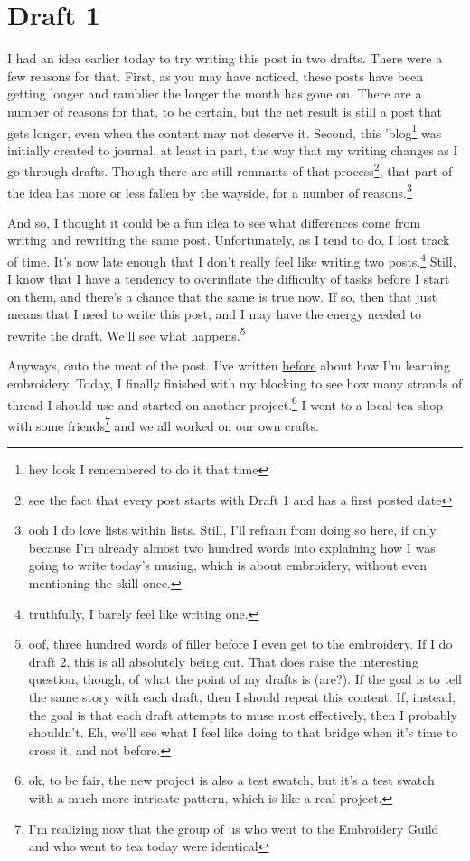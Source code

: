 \documentclass[12pt]{article}[titlepage]
\newcommand{\1}{\={a}}
\newcommand{\2}{\={e}}
\newcommand{\3}{\={\i}}
\newcommand{\4}{\=o}
\newcommand{\5}{\=u}
\newcommand{\6}{\={A}}
\renewcommand{\,}{\textsuperscript{,}}
\begin{document}
\section{Draft 1}
I had an idea earlier today to try writing this post in two drafts.
There were a few reasons for that.
First, as you may have noticed, these posts have been getting longer and ramblier the longer the month has gone on.
There are a number of reasons for that, to be certain, but the net result is still a post that gets longer, even when the content may not deserve it.
Second, this 'blog\footnote{hey look I remembered to do it that time} was initially created to journal, at least in part, the way that my writing changes as I go through drafts.
Though there are still remnants of that process\footnote{see the fact that every post starts with Draft 1 and has a first posted date}, that part of the idea has more or less fallen by the wayside, for a number of reasons.\footnote{ooh I do love lists within lists. Still, I'll refrain from doing so here, if only because I'm already almost two hundred words into explaining how I was going to write today's musing, which is about embroidery, without even mentioning the skill once.}

And so, I thought it could be a fun idea to see what differences come from writing and rewriting the same post.
Unfortunately, as I tend to do, I lost track of time.
It's now late enough that I don't really feel like writing two posts.\footnote{truthfully, I barely feel like writing one.}
Still, I know that I have a tendency to overinflate the difficulty of tasks before I start on them, and there's a chance that the same is true now.
If so, then that just means that I need to write this post, and I may have the energy needed to rewrite the draft.
We'll see what happens.\footnote{oof, three hundred words of filler before I even get to the embroidery.
If I do draft 2, this is all absolutely being cut.
That does raise the interesting question, though, of what the point of my drafts is (are?).
If the goal is to tell the same story with each draft, then I should repeat this content.
If, instead, the goal is that each draft attempts to muse most effectively, then I probably shouldn't.
Eh, we'll see what I feel like doing to that bridge when it's time to cross it, and not before.}

Anyways, onto the meat of the post.
I've written \href{embroidery.html}{before} about how I'm learning embroidery.
Today, I finally finished with my blocking to see how many strands of thread I should use and started on another project.\footnote{ok, to be fair, the new project is also a test swatch, but it's a test swatch with a much more intricate pattern, which is like a real project.}
I went to a local tea shop with some friends\footnote{I'm realizing now that the group of us who went to the Embroidery Guild and who went to tea today were identical} and we all worked on our own crafts.
\end{document}
